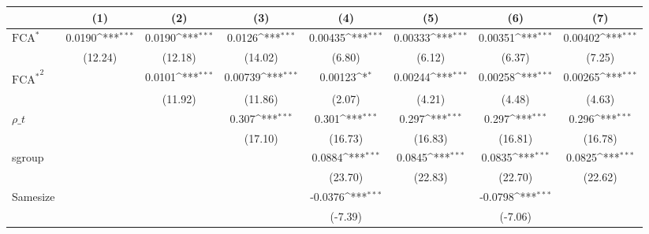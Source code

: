 {
\def\sym#1{\ifmmode^{#1}\else\(^{#1}\)\fi}
\begin{tabular}{l*{7}{c}}
\hline\hline
                    &\multicolumn{1}{c}{(1)}         &\multicolumn{1}{c}{(2)}         &\multicolumn{1}{c}{(3)}         &\multicolumn{1}{c}{(4)}         &\multicolumn{1}{c}{(5)}         &\multicolumn{1}{c}{(6)}         &\multicolumn{1}{c}{(7)}         \\
\hline
$ \text{FCA}^* $    &      0.0190\sym{***}&      0.0190\sym{***}&      0.0126\sym{***}&     0.00435\sym{***}&     0.00333\sym{***}&     0.00351\sym{***}&     0.00402\sym{***}\\
                    &     (12.24)         &     (12.18)         &     (14.02)         &      (6.80)         &      (6.12)         &      (6.37)         &      (7.25)         \\
[1em]
 $ { \text{FCA} ^ * } ^2 $&                     &      0.0101\sym{***}&     0.00739\sym{***}&     0.00123\sym{*}  &     0.00244\sym{***}&     0.00258\sym{***}&     0.00265\sym{***}\\
                    &                     &     (11.92)         &     (11.86)         &      (2.07)         &      (4.21)         &      (4.48)         &      (4.63)         \\
[1em]
$ \rho\_t $          &                     &                     &       0.307\sym{***}&       0.301\sym{***}&       0.297\sym{***}&       0.297\sym{***}&       0.296\sym{***}\\
                    &                     &                     &     (17.10)         &     (16.73)         &     (16.83)         &     (16.81)         &     (16.78)         \\
[1em]
sgroup              &                     &                     &                     &      0.0884\sym{***}&      0.0845\sym{***}&      0.0835\sym{***}&      0.0825\sym{***}\\
                    &                     &                     &                     &     (23.70)         &     (22.83)         &     (22.70)         &     (22.62)         \\
[1em]
Samesize            &                     &                     &                     &     -0.0376\sym{***}&                     &     -0.0798\sym{***}&                     \\
                    &                     &                     &                     &     (-7.39)         &                     &     (-7.06)         &                     \\

\end{tabular}}
